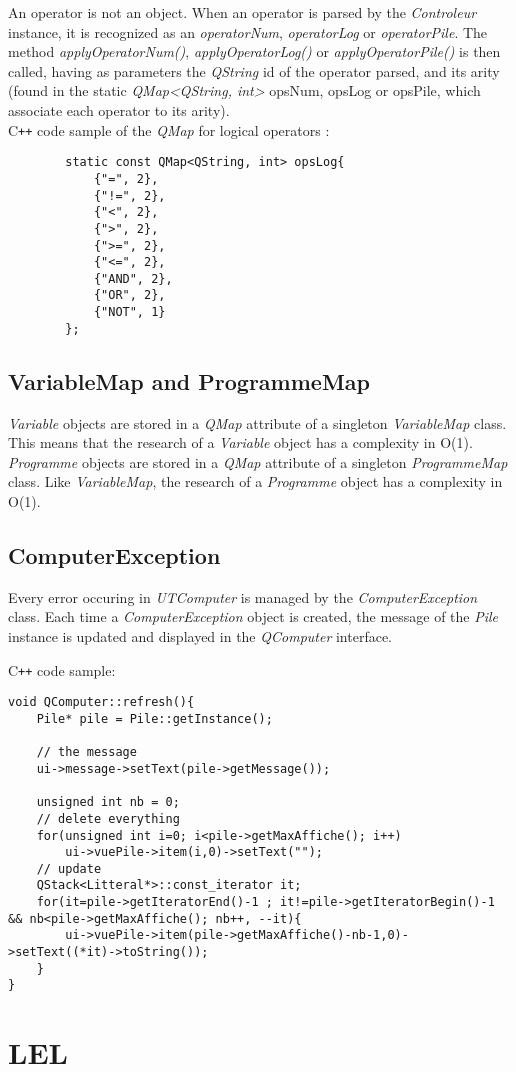 \documentclass[titlepage]{article}
\begin{document}
    An operator is not an object. When an operator is parsed by the \textit{Controleur} instance, it is recognized as an \textit{operatorNum}, \textit{operatorLog} or \textit{operatorPile}. The method \textit{applyOperatorNum()}, \textit{applyOperatorLog()} or \textit{applyOperatorPile()} is then called, having as parameters the \textit{QString} id of the operator parsed, and its arity (found in the static \textit{QMap<QString, int>} opsNum, opsLog or opsPile, which associate each operator to its arity).\\

    C\texttt{++} code sample of the \textit{QMap} for logical operators :
    \begin{lstlisting}
        static const QMap<QString, int> opsLog{
            {"=", 2},
            {"!=", 2},
            {"<", 2},
            {">", 2},
            {">=", 2},
            {"<=", 2},
            {"AND", 2},
            {"OR", 2},
            {"NOT", 1}
        };
    \end{lstlisting}

    \subsection{VariableMap and ProgrammeMap}

    \textit{Variable} objects are stored in a \textit{QMap} attribute of a singleton \textit{VariableMap} class. This means that the research of a \textit{Variable} object has a complexity in O(1).\\
    \textit{Programme} objects are stored in a \textit{QMap} attribute of a singleton \textit{ProgrammeMap} class. Like \textit{VariableMap}, the research of a \textit{Programme} object has a complexity in O(1).

    \subsection{ComputerException}

    Every error occuring in \textit{UTComputer} is managed by the \textit{ComputerException} class. Each time a \textit{ComputerException} object is created, the message of the \textit{Pile} instance is updated and displayed in the \textit{QComputer} interface.


C\texttt{++} code sample:
\begin{lstlisting}
void QComputer::refresh(){
    Pile* pile = Pile::getInstance();

    // the message
    ui->message->setText(pile->getMessage());

    unsigned int nb = 0;
    // delete everything
    for(unsigned int i=0; i<pile->getMaxAffiche(); i++)
        ui->vuePile->item(i,0)->setText("");
    // update
    QStack<Litteral*>::const_iterator it;
    for(it=pile->getIteratorEnd()-1 ; it!=pile->getIteratorBegin()-1 && nb<pile->getMaxAffiche(); nb++, --it){
        ui->vuePile->item(pile->getMaxAffiche()-nb-1,0)->setText((*it)->toString());
    }
}
\end{lstlisting}


\section{LEL}
\end{document}
